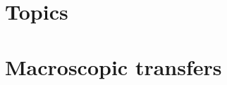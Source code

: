 \documentclass{article}
\begin{document}







% 
\printbibliography

\appendix

\section{\label{appendix:topics}Topics}



\section{\label{appendix:macro}Macroscopic transfers}




\end{document}
